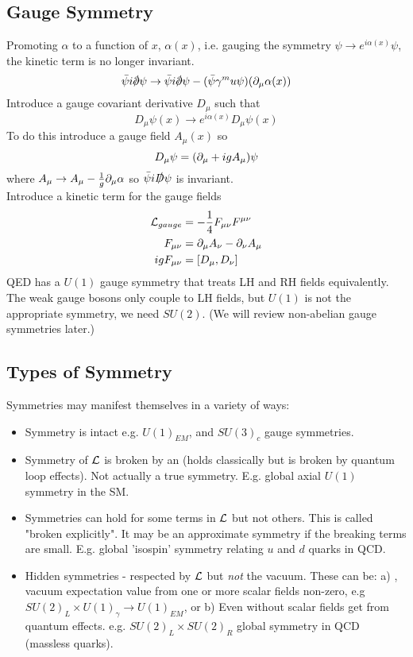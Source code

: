 \documentclass{article}
\begin{document}
\subsection{Gauge Symmetry}
Promoting $\alpha$ to a function of $x$, $\alpha(x)$, i.e. gauging the symmetry $\psi \to e^{i\alpha(x)} \psi$, the kinetic term is no longer invariant. 
\[
\bar{\psi} i \slashed{\del} \psi \to \bar{\psi} i \slashed{\del} \psi - (\bar{\psi}\gamma^mu \psi)(\del_\mu \alpha(x))
\]
Introduce a gauge covariant derivative $D_\mu$ such that
\[
D_\mu \psi(x) \to e^{i\alpha(x)} D_\mu \psi(x)
\]
To do this introduce a gauge field $A_\mu(x)$ so 
\[
D_\mu \psi = (\del_\mu + igA_\mu) \psi
\]
where $A_\mu \to A_\mu-\frac{1}{g} \del_\mu \alpha$ so $\bar{\psi} i \slashed{D} \psi$ is invariant. \\
Introduce a kinetic term for the gauge fields 
\begin{align*}
\mc{L}_{gauge} &= -\frac{1}{4} F_{\mu\nu} F^{\mu\nu} \\
F_{\mu\nu} &= \del_\mu A_\nu - \del_\nu A_\mu \\
ig F_{\mu\nu} &= \comm[D_\mu]{D_\nu}
\end{align*}
QED has a $U(1)$ gauge symmetry that treats LH and RH fields equivalently. The weak gauge bosons only couple to LH fields, but $U(1)$ is not the appropriate symmetry, we need $SU(2)$. (We will review non-abelian gauge symmetries later.) 

\subsection{Types of Symmetry}
Symmetries may manifest themselves in a variety of ways: 
\begin{itemize}
    \item Symmetry is intact e.g. $U(1)_{EM}$, and $SU(3)_c$ gauge symmetries. 
    \item Symmetry of $\mc{L}$ is broken by an  (holds classically but is broken by quantum loop effects). Not actually a true symmetry. E.g. global axial $U(1)$ symmetry in the SM.
    \item Symmetries can hold for some terms in $\mc{L}$ but not others. This is called "broken explicitly". It may be an approximate symmetry if the breaking terms are small. E.g. global 'isospin' symmetry relating $u$ and $d$ quarks in QCD.
    \item Hidden symmetries - respected by $\mc{L}$ but \emph{not} the vacuum. These can be: a) , vacuum expectation value from one or more scalar fields non-zero, e.g $SU(2)_L \times U(1)_\gamma \to U(1)_{EM}$, or b) Even without scalar fields get  from quantum effects. e.g. $SU(2)_L \times SU(2)_R$ global symmetry in QCD (massless quarks). 
\end{itemize}
\end{document}
